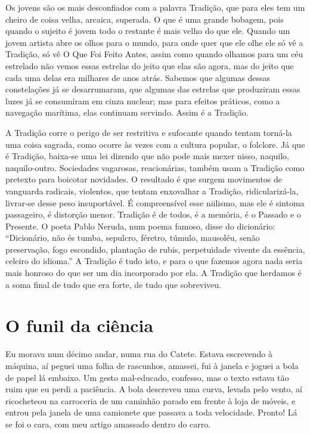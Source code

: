 Os jovens são os mais desconfiados com a palavra Tradição, que para
eles tem um cheiro de coisa velha, arcaica, superada. O que é uma
grande bobagem, pois quando o sujeito é jovem todo o restante é mais
velho do que ele. Quando um jovem artista abre os olhos para o mundo,
para onde quer que ele olhe ele só vê a Tradição, só vê O Que Foi
Feito Antes, assim como quando olhamos para um céu estrelado não
vemos essas estrelas do jeito que elas são agora, mas do jeito que
cada uma delas era milhares de anos atrás. Sabemos que algumas dessas
constelações já se desarrumaram, que algumas das estrelas que
produziram essas luzes já se consumiram em cinza nuclear; mas para
efeitos práticos, como a navegação marítima, elas continuam servindo.
Assim é a Tradição.

A Tradição corre o perigo de ser restritiva e sufocante quando tentam
torná-la uma coisa sagrada, como ocorre às vezes com a cultura
popular, o folclore. Já que é Tradição, baixa-se uma lei dizendo que
não pode mais mexer nisso, naquilo, naquilo-outro. Sociedades
vagarosas, reacionárias, também usam a Tradição como pretexto para
boicotar novidades. O resultado é que surgem movimentos de vanguarda
radicais, violentos, que tentam enxovalhar a Tradição,
ridicularizá-la, livrar-se desse peso insuportável. É compreensível
esse niilismo, mas ele é sintoma passageiro, é distorção menor. 
Tradição é de todos, é a memória, é o Passado e o Presente. O poeta
Pablo Neruda, num poema famoso, disse do dicionário: “Dicionário, não
és tumba, sepulcro, féretro, túmulo, mausoléu, senão preservação,
fogo escondido, plantação de rubis, perpetuidade vivente da essência,
celeiro do idioma.”  A Tradição é tudo isto, e para o que fazemos
agora nada seria mais honroso do que ser um dia incorporado por ela.
A Tradição que herdamos é a soma final de tudo que era forte, de tudo
que sobreviveu.

\chapter{O funil da ciência}

Eu morava num décimo andar, numa rua do Catete. Estava escrevendo à
máquina, aí peguei uma folha de rascunhos, amassei, fui à janela e
joguei a bola de papel lá embaixo. Um gesto mal-educado, confesso,
mas o texto estava tão ruim que eu perdi a paciência. A bola
descreveu uma curva, levada pelo vento, aí ricocheteou na carroceria
de um caminhão parado em frente à loja de móveis, e entrou pela
janela de uma camionete que passava a toda velocidade. Pronto! Lá se
foi o cara, com meu artigo amassado dentro do carro.

